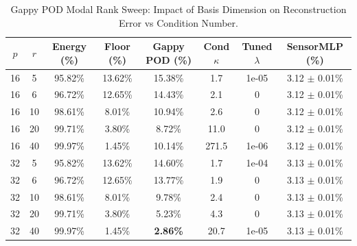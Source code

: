 \begin{table}[h!]
\centering
\caption{Gappy POD Modal Rank Sweep: Impact of Basis Dimension on Reconstruction Error vs Condition Number.}
\label{tab:gappy_rank_sweep}
\begin{tabular}{cccccccc}
\toprule
\textbf{$p$} & \textbf{$r$} & \textbf{Energy (\%)} & \textbf{Floor (\%)} & \textbf{Gappy POD (\%)} & \textbf{Cond $\kappa$} & \textbf{Tuned $\lambda$} & \textbf{SensorMLP (\%)} \\
\midrule
16 & 5 & 95.82\% & 13.62\% & 15.38\% & 1.7 & 1e-05 & 3.12 $\pm$ 0.01\% \\
16 & 6 & 96.72\% & 12.65\% & 14.43\% & 2.1 & 0 & 3.12 $\pm$ 0.01\% \\
16 & 10 & 98.61\% & 8.01\% & 10.94\% & 2.6 & 0 & 3.12 $\pm$ 0.01\% \\
16 & 20 & 99.71\% & 3.80\% & 8.72\% & 11.0 & 0 & 3.12 $\pm$ 0.01\% \\
16 & 40 & 99.97\% & 1.45\% & 10.14\% & 271.5 & 1e-06 & 3.12 $\pm$ 0.01\% \\
\midrule
32 & 5 & 95.82\% & 13.62\% & 14.60\% & 1.7 & 1e-04 & 3.13 $\pm$ 0.01\% \\
32 & 6 & 96.72\% & 12.65\% & 13.77\% & 1.9 & 0 & 3.13 $\pm$ 0.01\% \\
32 & 10 & 98.61\% & 8.01\% & 9.78\% & 2.4 & 0 & 3.13 $\pm$ 0.01\% \\
32 & 20 & 99.71\% & 3.80\% & 5.23\% & 4.3 & 0 & 3.13 $\pm$ 0.01\% \\
32 & 40 & 99.97\% & 1.45\% & \textbf{2.86\%} & 20.7 & 1e-05 & 3.13 $\pm$ 0.01\% \\
\bottomrule
\end{tabular}
\end{table}

